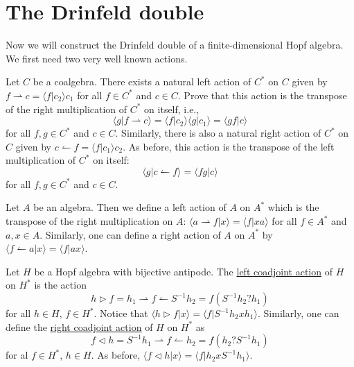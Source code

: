 \section{The Drinfeld double}

Now we will construct the Drinfeld double of a finite-dimensional Hopf algebra.
We first need two very well known actions.

\begin{exercise}
Let $C$ be a coalgebra. There exists a natural left action of $C^*$ on $C$
given by $f\rightharpoonup c=\langle f|c_2\rangle c_1$ for all $f\in C^*$ and
$c\in C$. Prove that this action is the transpose of the right
multiplication of $C^*$ on itself, i.e., 
\[
\langle g|f\rightharpoonup c\rangle=\langle f|c_2\rangle\langle g|c_1\rangle=\langle gf|c\rangle
\]
for all $f,g\in C^*$ and $c\in C$. 
Similarly, there is also a natural right action of $C^*$ on $C$ given by
$c \leftharpoonup f=\langle f|c_1\rangle c_2$.  As before, this action is the
transpose of the left multiplication of $C^*$ on itself: 
\[
\langle g|c\leftharpoonup f\rangle=\langle fg|c\rangle
\] 
for all $f,g\in C^*$ and $c\in C$.
\end{exercise}

\begin{exercise}
Let $A$ be an algebra. Then we define a left action of $A$ on $A^*$ which is
the transpose of the right multiplication on $A$: $\langle a\rightharpoonup
f|x\rangle=\langle f|xa\rangle$ for all $f\in A^*$ and $a,x\in A$. 
Similarly, one can define a right action of $A$ on $A^*$ by $\langle
f\leftharpoonup a|x\rangle = \langle f|ax\rangle$.
\end{exercise}

Let $H$ be a Hopf algebra with bijective antipode. The \underline{left
coadjoint action} of $H$ on $H^*$ is the action 
\[
h\triangleright f=h_1\rightharpoonup f\leftharpoonup S^{-1}h_2=f(S^{-1}h_2?h_1)
\]
for all $h\in H$, $f\in H^*$. Notice that $\langle h\triangleright
f|x\rangle=\langle f|S^{-1}h_2xh_1\rangle$. Similarly, one can define the
\underline{right coadjoint action} of $H$ on $H^*$ as 
\[
f\triangleleft h=S^{-1}h_1\rightharpoonup f\leftharpoonup h_2=f(h_2?S^{-1}h_1)
\]
for al $f\in H^*$, $h\in H$. As before, $\langle f\triangleleft h|x\rangle=\langle f|h_2xS^{-1}h_1\rangle$.

